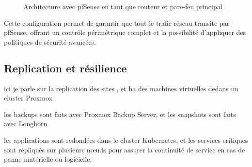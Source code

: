\begin{figure}[H]
	\centering
	\caption{Architecture avec pfSense en tant que routeur et pare-feu principal}
\end{figure}

Cette configuration permet de garantir que tout le trafic réseau transite par pfSense, offrant un contrôle périmétrique complet et la possibilité d’appliquer des politiques de sécurité avancées.

\subsection{Replication et résilience}

ici je parle sur la replication des
sites , et ha des machines virtuelles dedans un cluster Proxmox

les backups sont faits avec Proxmox Backup Server, et les snapshots sont faits avec Longhorn

les applications sont redondées dans le cluster Kubernetes, et les services critiques sont répliqués sur plusieurs nœuds pour assurer la continuité de service en cas de panne matérielle ou logicielle.
